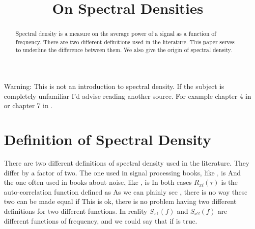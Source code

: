 \documentclass[final,a4paper]{IEEEtran}
\title{On Spectral Densities}
\begin{document}
\maketitle

\begin{abstract}
Spectral density is a measure on the average
power of a signal as a function of frequency. There are two different
definitions used in the literature. This paper serves to underline
the difference between them. We also give the origin of spectral density.
\end{abstract}

Warning: This is not an introduction to spectral density. If the
subject is completely unfamiliar I'd advise reading another source. For
example chapter 4 in \cite{johns} or chapter 7 in \cite{razavi}.

\section{Definition of Spectral Density}

There are two different definitions of spectral density used in the literature. They differ by a factor of two.
The one used in signal processing books, like  \cite{gray.r.m}, is 
And the one often used in books about noise, like \cite{ziel}, is
In both cases $R_{xi}(\tau)$ is the auto-correlation function defined as
As we can plainly see 
, there is no way these two can be made equal if 
This is ok, there is no
problem having two different definitions for two different
functions. In reality $S_{x1}(f)$ and $S_{x2}(f)$ are different functions of
frequency, and we could say that
 if  is true.  
\end{document}
